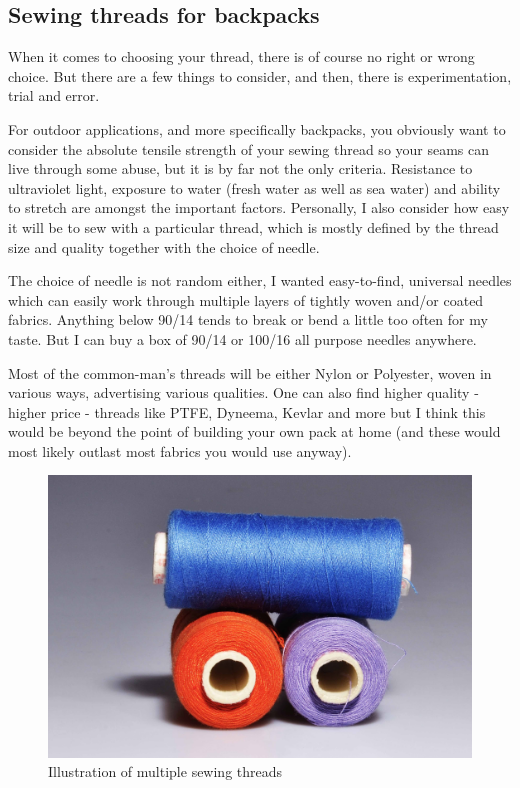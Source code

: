 \subsection{Sewing threads for backpacks} \label{sec:sewing-thread}

When it comes to choosing your thread, there is of course no right or wrong choice. But there are a few things to consider, and then, there is experimentation, trial and error.

For outdoor applications, and more specifically backpacks, you obviously want to consider the absolute tensile strength of your sewing thread so your seams can live through some abuse, but it is by far not the only criteria. Resistance to ultraviolet light, exposure to water (fresh water as well as sea water) and ability to stretch are amongst the important factors. Personally, I also consider how easy it will be to sew with a particular thread, which is mostly defined by the thread size and quality together with the choice of needle.

\begin{note}
  The choice of needle is not random either, I wanted easy-to-find, universal needles which can easily work through multiple layers of tightly woven and/or coated fabrics. Anything below 90/14 tends to break or bend a little too often for my taste. But I can buy a box of 90/14 or 100/16 all purpose needles anywhere.
\end{note}

Most of the common-man's threads will be either Nylon or Polyester, woven in various ways, advertising various qualities. One can also find higher quality - higher price - threads like PTFE, Dyneema, Kevlar and more but I think this would be beyond the point of building your own pack at home (and these would most likely outlast most fabrics you would use anyway).

\begin{figure}[H]
  \includegraphics[width=\textwidth]{media/images/place-holder}
  \caption{Illustration of multiple sewing threads}
  \label{img:sewing-threads}
\end{figure}

